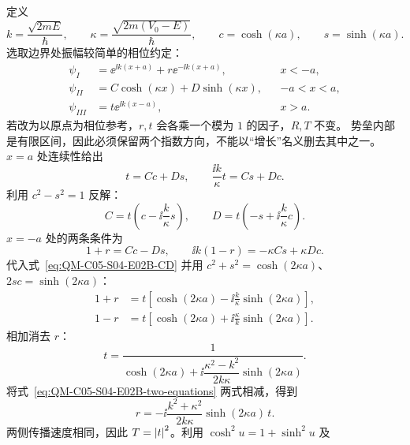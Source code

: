 \begin{checkedsolution}
定义
\begin{equation}
  k=\frac{\sqrt{2mE}}\hbar,
  \qquad
  \kappa=\frac{\sqrt{2m(V_0-E)}}\hbar,
  \qquad
  c=\cosh(\kappa a),
  \qquad
  s=\sinh(\kappa a).
\end{equation}
选取边界处振幅较简单的相位约定：
\begin{align}
  \psi_I&=\ee^{\ii k(x+a)}+r\ee^{-\ii k(x+a)},&&x<-a,\\
  \psi_{II}&=C\cosh(\kappa x)+D\sinh(\kappa x),&&-a<x<a,\\
  \psi_{III}&=t\ee^{\ii k(x-a)},&&x>a.
  \label{eq:QM-C05-S04-E02B-wavefunctions}
\end{align}
若改为以原点为相位参考，$r,t$ 会各乘一个模为 $1$ 的因子，$R,T$ 不变。
势垒内部是有限区间，因此必须保留两个指数方向，不能以“增长”名义删去其中之一。$x=a$ 处连续性给出
\begin{equation}
  t=Cc+Ds,
  \qquad
  \frac{\ii k}{\kappa}t=Cs+Dc.
\end{equation}
利用 $c^2-s^2=1$ 反解：
\begin{equation}
  C=t\left(c-\ii\frac{k}{\kappa}s\right),
  \qquad
  D=t\left(-s+\ii\frac{k}{\kappa}c\right).
  \label{eq:QM-C05-S04-E02B-CD}
\end{equation}
$x=-a$ 处的两条条件为
\begin{equation}
  1+r=Cc-Ds,
  \qquad
  \ii k(1-r)=-\kappa Cs+\kappa Dc.
\end{equation}
代入式~\eqref{eq:QM-C05-S04-E02B-CD} 并用
$c^2+s^2=\cosh(2\kappa a)$、$2sc=\sinh(2\kappa a)$：
\begin{align}
  1+r
  &=t\left[
    \cosh(2\kappa a)
    -\ii\frac{k}{\kappa}\sinh(2\kappa a)
  \right],\\
  1-r
  &=t\left[
    \cosh(2\kappa a)
    +\ii\frac{\kappa}{k}\sinh(2\kappa a)
  \right].
  \label{eq:QM-C05-S04-E02B-two-equations}
\end{align}
相加消去 $r$：
\begin{equation}
  t=
  \frac{1}{
    \cosh(2\kappa a)
    +\ii\dfrac{\kappa^2-k^2}{2k\kappa}
      \sinh(2\kappa a)}.
  \label{eq:QM-C05-S04-E02B-t}
\end{equation}
将式~\eqref{eq:QM-C05-S04-E02B-two-equations} 两式相减，得到
\begin{equation}
  r=-\ii\frac{k^2+\kappa^2}{2k\kappa}
    \sinh(2\kappa a)\,t.
  \label{eq:QM-C05-S04-E02B-r}
\end{equation}
两侧传播速度相同，因此 $T=\left|t\right|^2$。利用 $\cosh^2u=1+\sinh^2u$ 及
\begin{equation}

\end{equation}
\end{checkedsolution}
